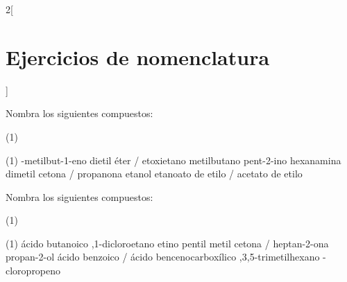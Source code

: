 \documentclass[10pt]{article}
\begin{document}
\begin{multicols}{2}[
  \section{Ejercicios de nomenclatura}
  ]

  \begin{exercise}[
      tags    = {orgánica,formulación,múltiple,2B},
      topics  = {química orgánica,formulación,nomenclatura},
      source  = {Química 2B SAN 2016, p391, e11},
    ]
    Nombra los siguientes compuestos:
    \begin{tasks}(1)
      \task {}
      \task {}
      \task {}
      \task {}
      \task {}
      \task {}
      \task {}
      \task {}
    \end{tasks}
  \end{exercise}

  \begin{solution}
    \begin{tasks}(1)
      -metilbut-1-eno
      \task dietil éter / etoxietano
      \task metilbutano
      \task pent-2-ino
      \task hexanamina
      \task dimetil cetona / propanona
      \task etanol
      \task etanoato de etilo / acetato de etilo
    \end{tasks}

  \end{solution}

  \begin{exercise}[
      tags    = {orgánica,formulación,múltiple,2B},
      topics  = {química orgánica,formulación,nomenclatura},
      source  = {Química 2B SAN 2016, p391, e12},
    ]
    Nombra los siguientes compuestos:

    \begin{tasks}(1)
      \task {}
      \task {}
      \task {}
      \task {}
      \task {}
      \task {}
      \task {}
      \task {}
    \end{tasks}
  \end{exercise}

\begin{solution}
  \begin{tasks}(1)
    \task ácido butanoico
    ,1-dicloroetano
    \task etino
    \task pentil metil cetona / heptan-2-ona
    \task propan-2-ol
    \task ácido benzoico / ácido bencenocarboxílico
    ,3,5-trimetilhexano
    -cloropropeno
  \end{tasks}
\end{solution}



\end{multicols}
\end{document}
